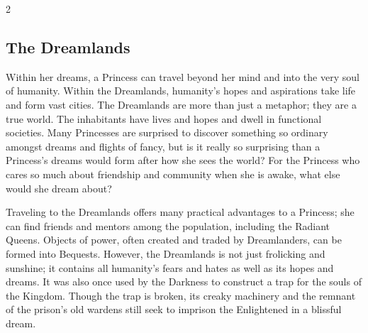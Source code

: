 \begin{multicols}{2}


\subsection*{The Dreamlands}

Within her dreams, a Princess can travel beyond her mind and into the very soul of humanity. Within the Dreamlands, humanity's hopes and aspirations take life and form vast cities. The Dreamlands are more than just a metaphor; they are a true world. The inhabitants have lives and hopes and dwell in functional societies. Many Princesses are surprised to discover something so ordinary amongst dreams and flights of fancy, but is it really so surprising than a Princess's dreams would form after how she sees the world? For the Princess who cares so much about friendship and community when she is awake, what else would she dream about? 

Traveling to the Dreamlands offers many practical advantages to a Princess; she can find friends and mentors among the population, including the Radiant Queens. Objects of power, often created and traded by Dreamlanders, can be formed into Bequests. However, the Dreamlands is not just frolicking and sunshine; it contains all humanity's fears and hates as well as its hopes and dreams. It was also once used by the Darkness to construct a trap for the souls of the Kingdom. Though the trap is broken, its creaky machinery and the remnant of the prison's old wardens still seek to imprison the Enlightened in a blissful dream. 


\end{multicols}
